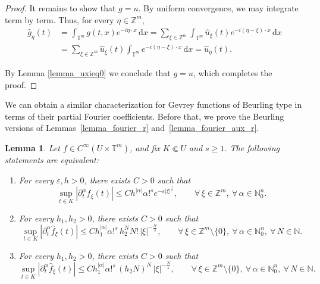 \documentclass[11pt,reqno]{amsart}
\numberwithin{equation}{section}
\newtheorem{lemma}[theorem]{Lemma}
\begin{document}
\begin{proof}
	It remains to show that \(g=u\).
	By uniform convergence, we may integrate term by term. Thus, for every \(\eta\in\mathbb{Z}^m\),
	\begin{align*}
		\widehat{g}_\eta(t)
		&=
		\int_{\mathbb{T}^m} g(t,x)e^{-i\eta\cdot x}\,\mathrm{d}x
		=
		\sum_{\xi\in\mathbb{Z}^m}\int_{\mathbb{T}^m}\widehat{u}_\xi(t)e^{-i(\eta-\xi)\cdot x}\,\mathrm{d}x\\
		&=
		\sum_{\xi\in\mathbb{Z}^m}\widehat{u}_\xi(t)\int_{\mathbb{T}^m} e^{-i(\eta-\xi)\cdot x}\,\mathrm{d}x
		=
		\widehat{u}_\eta(t).
	\end{align*}
	
	By Lemma \ref{lemma_uxieq0} we conclude that \(g=u\), which completes the proof.
\end{proof}

We can obtain a similar characterization for Gevrey functions of Beurling type in terms of their partial Fourier coefficients.
Before that, we prove the Beurling versions of Lemmas~\ref{lemma_fourier_r} and~\ref{lemma_fourier_aux_r}.

\begin{lemma}\label{lemma_fourier_b}
	Let \(f\in C^\infty(U\times\mathbb{T}^m)\), and fix \(K\Subset U\) and \(s\geq 1\).
	The following statements are equivalent:
	\begin{enumerate}
		\item For every \(\varepsilon,h>0\), there exists \(C>0\) such that
		\[
		\sup_{t\in K}|\partial_t^\alpha\widehat{f}_\xi(t)|
		\leq
		Ch^{|\alpha|}\alpha!^s e^{-\varepsilon|\xi|^{\frac{1}{s}}},\qquad\forall\, \xi\in\mathbb{Z}^m,\ \forall\, \alpha\in\mathbb{N}_0^n.
		\]
		
		\item For every \(h_1,h_2>0\), there exists \(C>0\) such that
		\[
		\sup_{t\in K}|\partial_t^\alpha\widehat{f}_\xi(t)|
		\leq
		Ch_1^{|\alpha|}\alpha!^s\, h_2^N N!\,|\xi|^{-\frac{N}{s}}, \qquad \forall\, \xi\in\mathbb{Z}^m\setminus\{0\},\ \forall\,\alpha\in\mathbb{N}_0^n,\ \forall\,N\in\mathbb{N}. 
		\]
		
		\item For every \(h_1,h_2>0\), there exists \(C>0\) such that
		\[
		\sup_{t\in K}|\partial_t^\alpha\widehat{f}_\xi(t)|
		\leq
		Ch_1^{|\alpha|}\alpha!^s\, (h_2N)^N\,|\xi|^{-\frac{N}{s}},\qquad \forall\, \xi\in\mathbb{Z}^m\setminus\{0\},\ \forall\,\alpha\in\mathbb{N}_0^n,\ \forall\, N\in\mathbb{N}.
		\]
	\end{enumerate}
\end{lemma}
\end{document}
